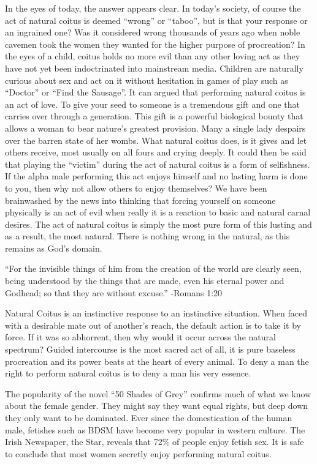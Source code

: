 In the eyes of today, the answer appears clear. In today’s society, of course 
the act of natural coitus is deemed “wrong” or “taboo”, but is that your 
response or an ingrained one? Was it considered wrong thousands of years ago 
when noble cavemen took the women they wanted for the higher purpose of 
procreation? In the eyes of a child, coitus holds no more evil than any other 
loving act as they have not yet been indoctrinated into mainstream media. 
Children are naturally curious about sex and act on it without hesitation in 
games of play such as “Doctor” or “Find the Sausage”. It can argued that 
performing natural coitus is an act of love. To give your seed to someone is a 
tremendous gift and one that carries over through a generation. This gift is a 
powerful biological bounty that allows a woman to bear nature’s greatest 
provision. Many a single lady despairs over the barren state of her wombs. What 
natural coitus does, is it gives and let others receive, most usually on all 
fours and crying deeply. It could then be said that playing the “victim” during 
the act of natural coitus is a form of selfishness. If the alpha male performing 
this act enjoys himself and no lasting harm is done to you, then why not allow 
others to enjoy themselves? We have been brainwashed by the news into thinking 
that forcing yourself on someone physically is an act of evil when really it is 
a reaction to basic and natural carnal desires. The act of natural coitus is 
simply the most pure form of this lusting and as a result, the most natural. 
There is nothing wrong in the natural, as this remains as God’s domain.


“For the invisible things of him from the creation of the world are clearly 
seen, being understood by the things that are made, even his eternal power and 
Godhead; so that they are without excuse.” -Romans 1:20


Natural Coitus is an instinctive response to an instinctive situation. When 
faced with a desirable mate out of another’s reach, the default action is to 
take it by force. If it was so abhorrent, then why would it occur across the 
natural spectrum? Guided intercourse is the most sacred act of all, it is pure 
baseless procreation and its power beats at the heart of every animal. To deny a 
man the right to perform natural coitus is to deny a man his very essence.


The popularity of the novel “50 Shades of Grey” confirms much of what we know 
about the female gender. They might say they want equal rights, but deep down 
they only want to be dominated. Ever since the domestication of the human male, 
fetishes such as BDSM have become very popular in western culture. The Irish 
Newspaper, the Star, reveals that 72\% of people enjoy fetish sex. It is safe to 
conclude that most women secretly enjoy performing natural coitus.  